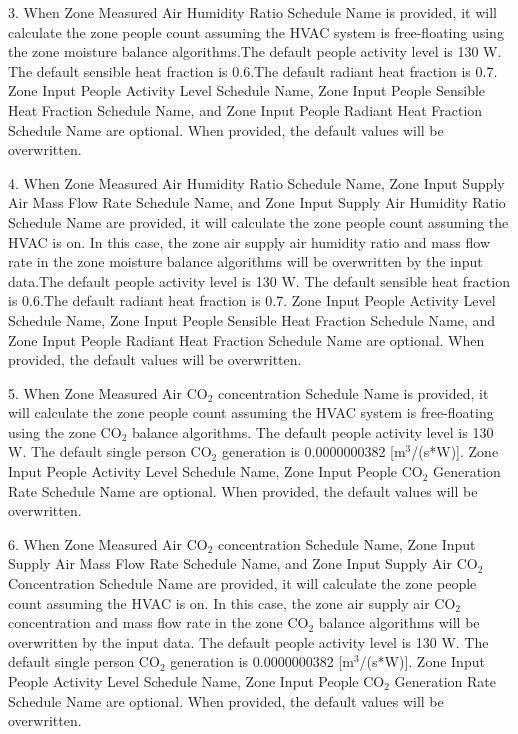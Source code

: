 3. When Zone Measured Air Humidity Ratio Schedule Name is provided, it will calculate the zone people count assuming the HVAC system is free-floating using the zone moisture balance algorithms.The default people activity level is 130 W. The default sensible heat fraction is 0.6.The default radiant heat fraction is 0.7. Zone Input People Activity Level Schedule Name, Zone Input People Sensible Heat Fraction Schedule Name, and Zone Input People Radiant Heat Fraction Schedule Name are optional. When provided, the default values will be overwritten.

4. When Zone Measured Air Humidity Ratio Schedule Name, Zone Input Supply Air Mass Flow Rate Schedule Name, and Zone Input Supply Air Humidity Ratio Schedule Name are provided, it will calculate the zone people count assuming the HVAC is on. In this case, the zone air supply air humidity ratio and mass flow rate in the zone moisture balance algorithms will be overwritten by the input data.The default people activity level is 130 W. The default sensible heat fraction is 0.6.The default radiant heat fraction is 0.7. Zone Input People Activity Level Schedule Name, Zone Input People Sensible Heat Fraction Schedule Name, and Zone Input People Radiant Heat Fraction Schedule Name are optional. When provided, the default values will be overwritten.

5. When Zone Measured Air CO$_2$ concentration Schedule Name is provided, it will calculate the zone people count assuming the HVAC system is free-floating using the zone CO$_2$ balance algorithms. The default people activity level is 130 W. The default single person CO$_2$ generation is 0.0000000382 [m$^3$/(s*W)]. Zone Input People Activity Level Schedule Name, Zone Input People CO$_2$ Generation Rate Schedule Name are optional. When provided, the default values will be overwritten.

6. When Zone Measured Air CO$_2$ concentration Schedule Name, Zone Input Supply Air Mass Flow Rate Schedule Name, and Zone Input Supply Air CO$_2$ Concentration Schedule Name are provided, it will calculate the zone people count assuming the HVAC is on. In this case, the zone air supply air CO$_2$ concentration and mass flow rate in the zone CO$_2$ balance algorithms will be overwritten by the input data. The default people activity level is 130 W. The default single person CO$_2$ generation is 0.0000000382 [m$^3$/(s*W)]. Zone Input People Activity Level Schedule Name, Zone Input People CO$_2$ Generation Rate Schedule Name are optional. When provided, the default values will be overwritten.

